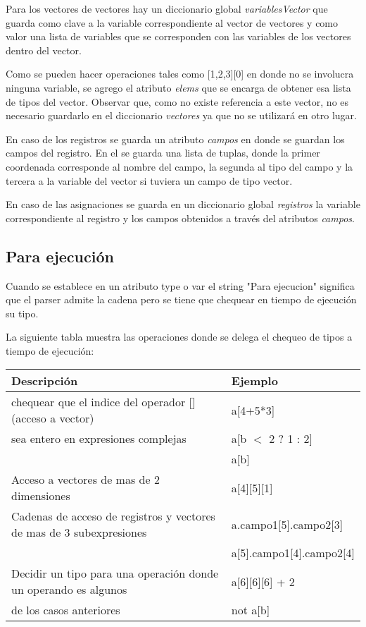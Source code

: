 Para los vectores de vectores hay un diccionario global \textit{variablesVector} que guarda como clave a la variable correspondiente al vector de vectores y como valor una lista de variables que se corresponden con las variables de los vectores dentro del vector.

Como se pueden hacer operaciones tales como [1,2,3][0] en donde no se involucra ninguna variable, se agrego el atributo \textit{elems} que se encarga de obtener esa lista de tipos del vector. Observar que, como no existe referencia a este vector, no es necesario guardarlo en el diccionario \textit{vectores} ya que no se utilizará en otro lugar.

En caso de los registros se guarda un atributo \textit{campos} en donde se guardan los campos del registro. En el se guarda una lista de tuplas, donde la primer coordenada corresponde al nombre del campo, la segunda al tipo del campo y la tercera a la variable del vector si tuviera un campo de tipo vector.

En caso de las asignaciones se guarda en un diccionario global \textit{registros} la variable correspondiente al registro y los campos obtenidos a través del atributos \textit{campos}.

\subsection{Para ejecución}
Cuando se establece en un atributo type o var el string "Para ejecucion" significa que el parser admite la cadena pero se tiene que chequear en tiempo de ejecución su tipo. 

La siguiente tabla muestra las operaciones donde se delega el chequeo de tipos a tiempo de ejecución:\\
\vspace{4mm}
\begin{table}[ht]
\begin{center}
\begin{tabular}{|l|l|}
\hline
Descripción & Ejemplo \\
\hline
chequear que el indice del operador [] (acceso a vector)	& a[4+5*3] \\
 sea entero en expresiones complejas	& a[b $<$ 2 ? 1 : 2] \\
  										& a[b] \\
\hline
Acceso a vectores de mas de 2 dimensiones & a[4][5][1] \\
\hline
Cadenas de acceso de registros y vectores de mas de 3 subexpresiones & a.campo1[5].campo2[3] \\
										& a[5].campo1[4].campo2[4] \\
\hline
Decidir un tipo para una operación donde un operando es algunos  & a[6][6][6] + 2 \\
de los casos anteriores  & not a[b]\\
\hline
\end{tabular}
\end{center}
\end{table}

